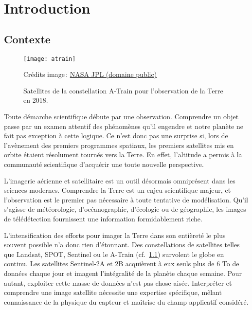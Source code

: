 \chapter{Introduction}
\label{chap:intro}
	\minitoc
	\newpage

\section{Contexte}

\begin{figure}[h]
	\texttt{[image: atrain]}
	\caption{Satellites de la constellation A-Train pour l'observation de la Terre en 2018.}
	{\small Crédits image\,: \href{https://commons.wikimedia.org/w/index.php?curid=33645603}{NASA JPL (domaine public)}}
	\label{fig:atrain}
\end{figure}

Toute démarche scientifique débute par une observation. Comprendre un objet passe par un examen attentif des phénomènes qu'il engendre et notre planète ne fait pas exception à cette logique. Ce n'est donc pas une surprise si, lors de l'avènement des premiers programmes spatiaux, les premiers satellites mis en orbite étaient résolument tournés vers la Terre. En effet, l'altitude a permis à la communauté scientifique d'acquérir une toute nouvelle perspective.

L'imagerie aérienne et satellitaire est un outil désormais omniprésent dans les sciences modernes. Comprendre la Terre est un enjeu scientifique majeur, et l'observation est le premier pas nécessaire à toute tentative de modélisation. Qu'il s'agisse de météorologie, d'océanographie, d'écologie ou de géographie, les images de télédétection fournissent une information formidablement riche.

L'intensification des efforts pour imager la Terre dans son entièreté le plus souvent possible n'a donc rien d'étonnant. Des constellations de satellites telles que \gls{Landsat}, \gls{SPOT}, \gls{Sentinel} ou le A-Train (cf.~\cref{fig:atrain}) survolent le globe en continu. Les satellites Sentinel-2A et 2B acquièrent à eux seuls plus de 6 To de données chaque jour et imagent l'intégralité de la planète chaque semaine. Pour autant, exploiter cette masse de données n'est pas chose aisée. Interpréter et comprendre une image satellite nécessite une expertise spécifique, mêlant connaissance de la physique du capteur et maîtrise du champ applicatif considéré.

